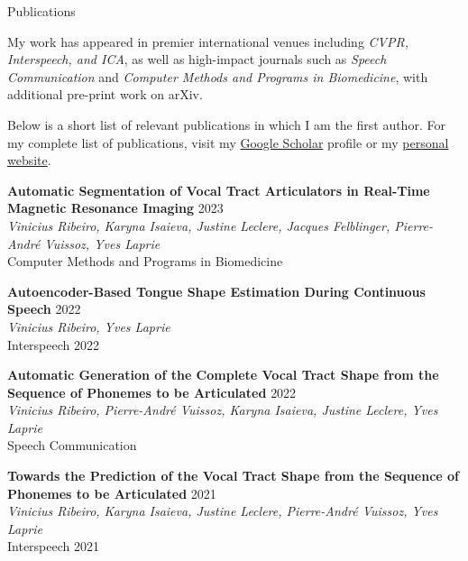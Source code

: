 \documentclass{config/resume} %
\begin{document}
\begin{rSection}{Publications}

My work has appeared in premier international venues including \textit{CVPR, Interspeech, and ICA}, as well as high-impact journals such as \textit{Speech Communication} and \textit{Computer Methods and Programs in Biomedicine}, with additional pre-print work on arXiv.

Below is a short list of relevant publications in which I am the first author. For my complete list of publications, visit my \href{https://scholar.google.com/citations?user=0FLmaIMAAAAJ&hl=en}{Google Scholar} profile or my \href{https://vribeiro1.github.io/publications/}{personal website}.

\medskip

\textbf{Automatic Segmentation of Vocal Tract Articulators in Real-Time Magnetic Resonance Imaging} \hfill {2023} \\
\textit{Vinicius Ribeiro, Karyna Isaieva, Justine Leclere, Jacques Felblinger, Pierre-André Vuissoz, Yves Laprie} \\
Computer Methods and Programs in Biomedicine \smallskip

\textbf{Autoencoder-Based Tongue Shape Estimation During Continuous Speech} \hfill {2022} \\
\textit{Vinicius Ribeiro, Yves Laprie} \\
Interspeech 2022 \smallskip

\textbf{Automatic Generation of the Complete Vocal Tract Shape from the Sequence of Phonemes to be Articulated} \hfill {2022} \\
\textit{Vinicius Ribeiro, Pierre-André Vuissoz, Karyna Isaieva, Justine Leclere, Yves Laprie} \\
Speech Communication \smallskip

\textbf{Towards the Prediction of the Vocal Tract Shape from the Sequence of Phonemes to be Articulated} \hfill {2021} \\
\textit{Vinicius Ribeiro, Karyna Isaieva, Justine Leclere, Pierre-André Vuissoz, Yves Laprie} \\
Interspeech 2021

\end{rSection}
\end{document}
